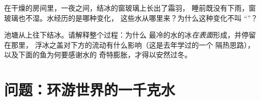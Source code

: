 \begin{exercise}[$\star\star$]\label{exo:g6:water-states:11}
在干燥的房间里，一夜之间，结冰的窗玻璃上长出了霜羽，
睡前既没有下雨，窗玻璃也不湿。水经历的是哪种变化，
这些水从哪里来？为什么这种变化不叫
“”？
\end{exercise}

\begin{exercise}[$\star\star\star$]\label{exo:g6:water-states:12}
池塘从上往下结冰。请解释整个过程：为什么
最冷的水的冰\emph{在表面}形成，并停留在那里，
浮冰之盖对下方的流动有什么影响（这是去年学过的一个
隔热思路），以及下面的鱼为何要感谢水的
奇特膨胀，才得以安然过冬。
\end{exercise}

\section{问题：环游世界的一千克水}

